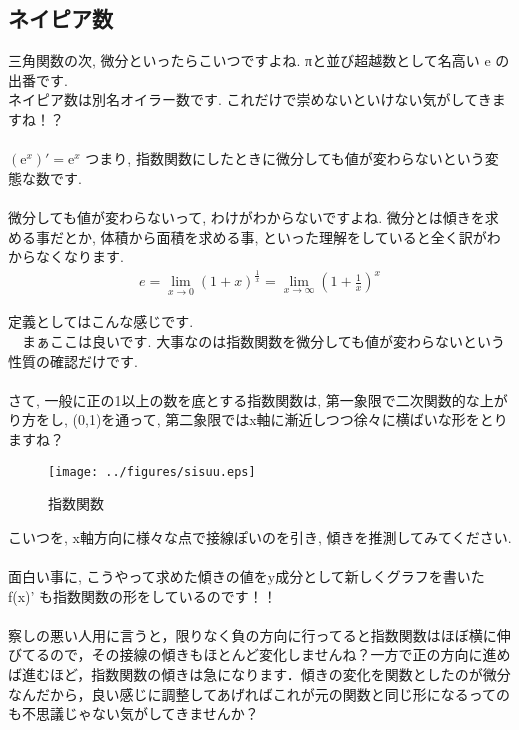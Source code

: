 \documentclass[11pt,a4paper]{ujreport}
\begin{document}
\subsection{ネイピア数}
三角関数の次, 微分といったらこいつですよね. πと並び超越数として名高い e の出番です.\\
ネイピア数は別名オイラー数です. これだけで崇めないといけない気がしてきますね！？\\
\\
$(\mathrm{e}^x)' = \mathrm{e}^x$ つまり, 指数関数にしたときに微分しても値が変わらないという変態な数です.\\
\\

微分しても値が変わらないって, わけがわからないですよね. 微分とは傾きを求める事だとか, 体積から面積を求める事, といった理解をしていると全く訳がわからなくなります.\\
\begin{eqnarray}
e = \lim_{x\to 0} (1+x)^\frac{1}{x} = \lim_{x \to \infty} (1+\frac{1}{x})^x
\end{eqnarray}

定義としてはこんな感じです.\\
　まぁここは良いです. 大事なのは指数関数を微分しても値が変わらないという性質の確認だけです.\\
\\

さて, 一般に正の1以上の数を底とする指数関数は, 第一象限で二次関数的な上がり方をし, (0,1)を通って, 第二象限ではx軸に漸近しつつ徐々に横ばいな形をとりますね？\\
\begin{figure}[H]
\label{im:sisuu}
  \centering
  \texttt{[image: ../figures/sisuu.eps]}
  \caption{指数関数}
\end{figure}

こいつを, x軸方向に様々な点で接線ぽいのを引き, 傾きを推測してみてください. \\
\\

面白い事に, こうやって求めた傾きの値をy成分として新しくグラフを書いた f(x)' も指数関数の形をしているのです！！\\
\\

察しの悪い人用に言うと，限りなく負の方向に行ってると指数関数はほぼ横に伸びてるので，その接線の傾きもほとんど変化しませんね？一方で正の方向に進めば進むほど，指数関数の傾きは急になります．傾きの変化を関数としたのが微分なんだから，良い感じに調整してあげればこれが元の関数と同じ形になるってのも不思議じゃない気がしてきませんか？\\
\\
\end{document}
